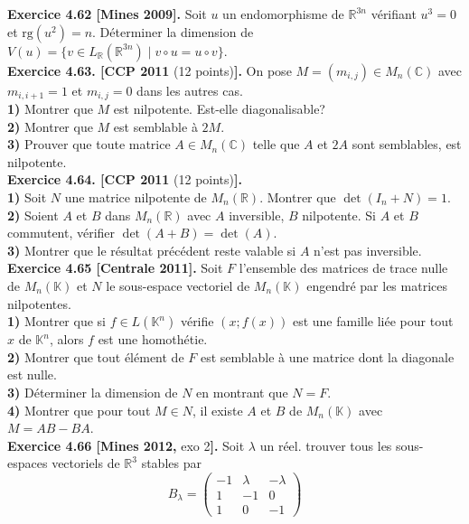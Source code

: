 \documentclass[a4paper,12pt,francais]{article}
\newcommand{\field}[1]{\mathbb{#1}}
\newcommand{\R}{\field{R}}
\newcommand{\C}{\field{C}}
\newcommand{\K}{\field{K}}
\newcommand{\rg}{\mbox{rg}}
\begin{document}
\noindent
{\bf Exercice 4.62 [Mines 2009].} Soit $u$ un endomorphisme de $\R^{3n}$ vérifiant $u^3=0$ et $\rg(u^2)=n$. Déterminer la dimension de $V(u)=\{v \in L_{\R}(\R^{3n})\; | \; v \circ u =u \circ v \}.$\\

\noindent
{\bf Exercice 4.63. [CCP 2011} (12 points){\bf ].} On pose $M=(m_{i,j}) \in M_n(\C)$ avec $m_{i,i+1}=1$ et $m_{i,j}=0$ dans les autres cas.\\
{\bf 1)} Montrer que $M$ est nilpotente. Est-elle diagonalisable?\\
{\bf 2)} Montrer que $M$ est semblable à $2M$.\\
{\bf 3)} Prouver que toute matrice $A \in M_n(\C)$ telle que $A$ et $2A$ sont semblables, est nilpotente.\\

\noindent
{\bf Exercice 4.64. [CCP 2011} (12 points){\bf ].}\\
{\bf 1)} Soit $N$ une matrice nilpotente de $M_n(\R)$. Montrer que $\det(I_n+N)=1$.\\
{\bf 2)} Soient $A$ et $B$ dans $M_n(\R)$ avec $A$ inversible, $B$ nilpotente. Si $A$ et $B$ commutent, vérifier $\det(A+B)=\det(A)$.\\
{\bf 3)} Montrer que le résultat précédent reste valable si $A$ n'est pas inversible.\\

\noindent
{\bf Exercice 4.65 [Centrale 2011].} Soit $F$ l'ensemble des matrices de trace nulle de $M_n(\K)$ et $N$ le sous-espace vectoriel de $M_n(\K)$ engendré par les matrices nilpotentes.\\
{\bf 1)} Montrer que si $f\in L(\K^n)$ vérifie $(x;f(x))$ est une famille liée pour tout $x$ de $\K^n$, alors $f$ est une homothétie.\\
{\bf 2)} Montrer que tout élément de $F$ est semblable à une matrice dont la diagonale est nulle.\\
{\bf 3)} Déterminer la dimension de $N$ en montrant que $N=F$.\\
{\bf 4)} Montrer que pour tout $M\in N$, il existe $A$ et $B$ de $M_n(\K)$ avec $M=AB-BA$.\\

\noindent
{\bf Exercice 4.66 [Mines 2012,} exo 2{\bf].} Soit $\lambda$ un réel. trouver tous les sous-espaces vectoriels de $\R^3$ stables par 
$$B_\lambda=\left( 
\begin{array}{ccc}
-1&\lambda& -\lambda \\
1&-1&0\\
1&0&-1
\end{array}
\right)$$
\end{document}
